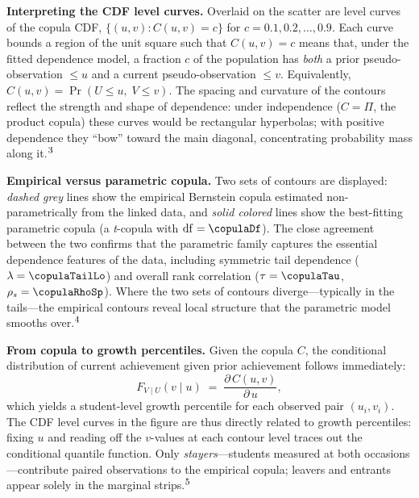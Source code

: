 \documentclass[10pt]{article}
\begin{document}
\begin{minipage}[t]{7.8in}
\begin{minipage}{7.4in}
    \vspace{6pt}
    \textbf{Interpreting the CDF level curves.}\enspace
    Overlaid on the scatter are level curves of the copula CDF,
    $\{(u,v) : C(u,v) = c\}$ for $c = 0.1, 0.2, \ldots, 0.9$.
    Each curve bounds a region of the unit square such that
    $C(u,v) = c$ means that, under the fitted dependence model, a fraction
    $c$ of the population has \emph{both} a prior pseudo-observation $\leq u$
    and a current pseudo-observation $\leq v$. Equivalently,
    $C(u,v) = \Pr(U \leq u,\; V \leq v)$.
    The spacing and curvature of the contours reflect the strength and shape of
    dependence: under independence ($C = \Pi$, the product copula) these curves
    would be rectangular hyperbolas; with positive dependence they ``bow'' toward
    the main diagonal, concentrating probability mass along
    it.$^{\mbox{\footnotesize{3}}}$

    \vspace{6pt}
    \textbf{Empirical versus parametric copula.}\enspace
    Two sets of contours are displayed: \textit{dashed grey} lines show
    the empirical Bernstein copula estimated non-parametrically from the linked
    data, and \textit{solid colored} lines show the best-fitting parametric copula
    (a \textit{t}-copula with $\mathrm{df} = \copulaDf$).
    The close agreement between the two confirms that the parametric family
    captures the essential dependence features of the data, including symmetric
    tail dependence ($\lambda = \copulaTailLo$) and overall rank
    correlation ($\tau = \copulaTau$, $\rho_s = \copulaRhoSp$).
    Where the two sets of contours diverge---typically in the tails---the
    empirical contours reveal local structure that the parametric model
    smooths over.$^{\mbox{\footnotesize{4}}}$

    \vspace{6pt}
    \textbf{From copula to growth percentiles.}\enspace
    Given the copula $C$, the conditional distribution of current achievement
    given prior achievement follows immediately:
    \begin{equation}
      F_{V \mid U}(v \mid u)
        \;=\; \frac{\partial\, C(u,v)}{\partial\, u},
      \tag{M.5}
    \end{equation}
    which yields a student-level growth percentile for each observed
    pair $(u_i,v_i)$. The CDF level curves in the figure are thus directly
    related to growth percentiles: fixing $u$ and reading off the $v$-values
    at each contour level traces out the conditional quantile function.
    Only \emph{stayers}---students measured at both occasions---contribute paired
    observations to the empirical copula; leavers and entrants appear solely
    in the marginal strips.$^{\mbox{\footnotesize{5}}}$


\end{minipage}
\end{minipage}
\end{document}
